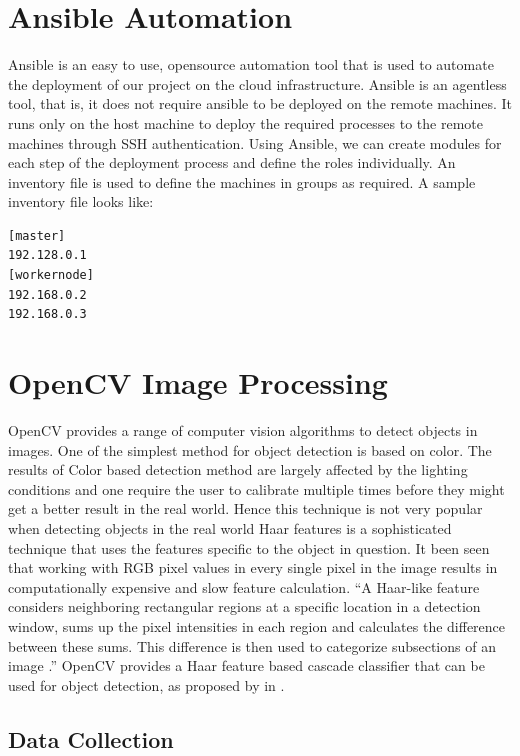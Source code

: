\documentclass[9pt,twocolumn,twoside]{../../styles/osajnl}
\begin{document}
\section{Ansible Automation}
Ansible is an easy to use, opensource automation tool that is used to
automate the deployment of our project on the cloud
infrastructure. Ansible is an agentless tool, that is, it does not
require ansible to be deployed on the remote machines. It runs only on
the host machine to deploy the required processes to the remote
machines through SSH authentication.  Using Ansible, we can create
modules for each step of the deployment process and define the roles
individually. An inventory file is used to define the machines in
groups as required. A sample inventory file looks like:
\begin{verbatim} 
[master] 
192.128.0.1 
[workernode] 
192.168.0.2 
192.168.0.3
\end{verbatim}

\section{OpenCV Image Processing}

OpenCV provides a range of computer vision algorithms to detect
objects in images. One of the simplest method for object detection is
based on color. The results of Color based detection method are
largely affected by the lighting conditions and one require the user
to calibrate multiple times before they might get a better result in
the real world. Hence this technique is not very popular when
detecting objects in the real world Haar features is a sophisticated
technique that uses the features specific to the object in
question. It been seen that working with RGB pixel values in every
single pixel in the image results in computationally expensive and
slow feature calculation. “A Haar-like feature considers neighboring
rectangular regions at a specific location in a detection window, sums
up the pixel intensities in each region and calculates the difference
between these sums. This difference is then used to categorize
subsections of an image \cite{paper-objectdetection}.” OpenCV provides
a Haar feature based cascade classifier that can be used for object
detection, as proposed by in \cite{paper-ROD}.

\subsection{Data Collection}
\end{document}
